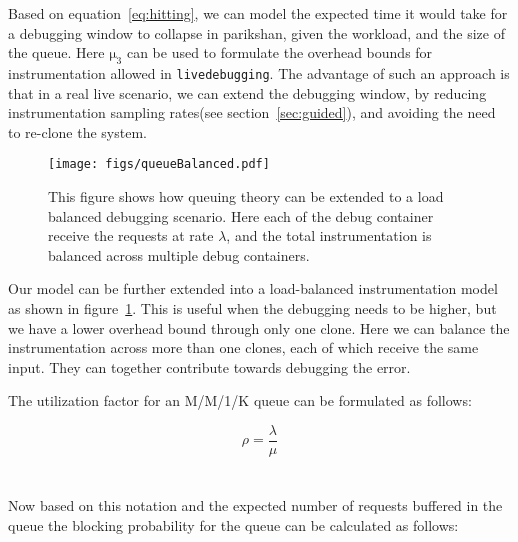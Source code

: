 Based on equation~\ref{eq:hitting}, we can model the expected time it would take for a debugging window to collapse in parikshan, given the workload, and the size of the queue. 
Here $\mathrm{\mu_{3}}$ can be used to formulate the overhead bounds for instrumentation allowed in \texttt{livedebugging}.
The advantage of such an approach is that in a real live scenario, we can extend the debugging window, by reducing instrumentation sampling rates(see section~\ref{sec:guided}), and avoiding the need to re-clone the system.

\noindent{}

\begin{figure}[h]
	\begin{center}
		\texttt{[image: figs/queueBalanced.pdf]}
		\caption{This figure shows how queuing theory can be extended to a load balanced debugging scenario. Here each of the debug container receive the requests at rate $\lambda$, and the total instrumentation is balanced across multiple debug containers.}
		\label{fig:queueBalanced}
	\end{center}
\end{figure}

Our model can be further extended into a load-balanced instrumentation model as shown in figure~\ref{fig:queueBalanced}. 
This is useful when the debugging needs to be higher, but we have a lower overhead bound through only one clone.
Here we can balance the instrumentation across more than one clones, each of which receive the same input.
They can together contribute towards debugging the error.

\iffalse
The utilization factor for an M/M/1/K queue can be formulated as follows:

\begin{equation}
\rho = \frac{\lambda}{\mu}
\end{equation}
\\ \\

Now based on this notation and the expected number of requests buffered in the queue the blocking probability for the queue can be calculated as follows:


